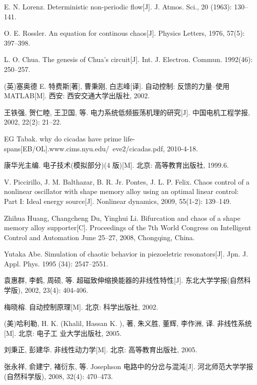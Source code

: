 \documentclass[withoutpreface,bwprint]{cumcmthesis} %
\begin{document}
\begin{thebibliography}{99}

  E. N. Lorenz. Deterministic non-periodic flow[J]. J. Atmos. Sci., 20 (1963): 130--141.

   O. E. Rossler. An equation for continous chaos[J]. Physics Letters, 1976, 57(5): 397--398.

   L. O. Chua. The genesis of Chua's circuit[J]. Int. J. Electron. Commun. 1992(46): 250--257.

   (英)塞奥德 E. 特费斯[著], 曹秉刚, 白志峰[译]. 自动控制: 反馈的力量--使用MATLAB[M].
   西安: 西安交通大学出版社, 2002.

   王铁强, 贺仁睦, 王卫国, 等. 电力系统低频振荡机理的研究[J]. 中国电机工程学报,
  2002, 22(2): 21--22.

   EG Tabak. why do cicadas have prime life-spans[EB/OL].www.cims.nyu.edu/~eve2/cicadas.pdf, 2010-4-18.

   康华光主编. 电子技术(模拟部分)(4 版)[M]. 北京: 高等教育出版社, 1999.6.

   V. Piccirillo, J. M. Balthazar, B. R. Jr. Pontes, J. L. P. Felix. Chaos control of a nonlinear oscillator with shape
  memory alloy using an optimal linear control: Part I: Ideal energy source[J]. Nonlinear dynamics, 2009, 55(1-2): 139--149.

   Zhihua Huang, Changcheng Du, Yinghui Li. Bifurcation and chaos of a shape memory alloy supporter[C]. Proceedings of the 7th World Congress on Intelligent Control and Automation June 25--27, 2008, Chongqing,
  China.

   Yutaka Abe. Simulation of chaotic behavior in piezoeletric resonators[J]. Jpn. J. Appl. Phys. 1995 (34): 2547--2551.

   袁惠群, 李鹤, 周硕, 等. 超磁致伸缩换能器的非线性特性[J]. 东北大学学报(自然科学版), 2002, 23(4): 404-406.

   梅晓榕. 自动控制原理[M]. 北京: 科学出版社, 2002.

   (美)哈利勒, H. K. (Khalil, Hassan K. ),
  著, 朱义胜, 董辉, 李作洲, 译. 非线性系统[M]. 北京: 电子工
  业大学出版社, 2005.

   刘秉正, 彭建华. 非线性动力学[M]. 北京: 高等教育出版社, 2005.

   张永祥, 俞建宁, 褚衍东, 等. Josephson 电路中的分岔与混沌[J]. 河北师范大学学报(自然科学版), 2008, 32(4): 470--473.


\end{thebibliography}
\end{document}
